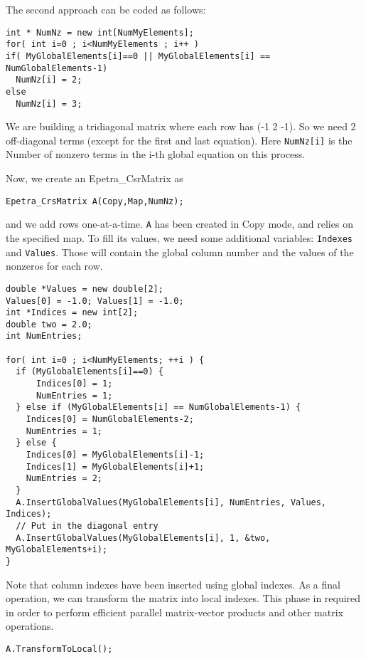 The second approach can be coded as follows:
\begin{verbatim}
int * NumNz = new int[NumMyElements];
for( int i=0 ; i<NumMyElements ; i++ )
if( MyGlobalElements[i]==0 || MyGlobalElements[i] == NumGlobalElements-1)
  NumNz[i] = 2;
else
  NumNz[i] = 3;
\end{verbatim}
We are building a tridiagonal matrix where each row has (-1 2 -1). So we
need 2 off-diagonal terms (except for the first and last equation). Here
\verb!NumNz[i]! is the Number of nonzero terms in the i-th global
equation on this process.

Now, we create an Epetra\_CsrMatrix as
\begin{verbatim}
Epetra_CrsMatrix A(Copy,Map,NumNz);
\end{verbatim}
and we add rows one-at-a-time. \verb!A! has been created in Copy mode,
and relies on the specified map. To fill its values, we need some
additional variables: \verb!Indexes! and \verb!Values!. Those will
contain the global column number and the values of the nonzeros for each
row.
\begin{verbatim}
double *Values = new double[2];
Values[0] = -1.0; Values[1] = -1.0;
int *Indices = new int[2];
double two = 2.0;
int NumEntries;

for( int i=0 ; i<NumMyElements; ++i ) {
  if (MyGlobalElements[i]==0) {
      Indices[0] = 1;
      NumEntries = 1;
  } else if (MyGlobalElements[i] == NumGlobalElements-1) {
    Indices[0] = NumGlobalElements-2;
    NumEntries = 1;
  } else {
    Indices[0] = MyGlobalElements[i]-1;
    Indices[1] = MyGlobalElements[i]+1;
    NumEntries = 2;
  }
  A.InsertGlobalValues(MyGlobalElements[i], NumEntries, Values, Indices);
  // Put in the diagonal entry
  A.InsertGlobalValues(MyGlobalElements[i], 1, &two, MyGlobalElements+i);
}
\end{verbatim}

Note that column indexes have been inserted using global indexes.
As a final operation, we can transform the matrix into local
indexes. This phase in required in order to perform efficient parallel
matrix-vector products and other matrix operations.
\begin{verbatim}
A.TransformToLocal();
\end{verbatim}

